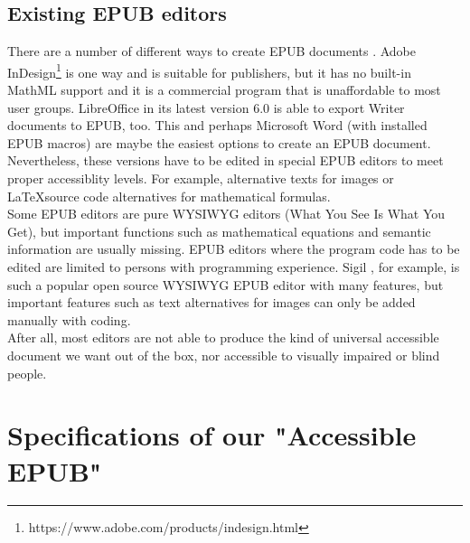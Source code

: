 \documentclass[runningheads,a4paper]{llncs}
\begin{document}
\subsection{Existing EPUB editors}
\label{ch:exEPUB}
There are a number of different ways to create EPUB documents \cite{EPUBprograms}. Adobe InDesign\footnote{https://www.adobe.com/products/indesign.html} is one way and is suitable for publishers, but it has no built-in MathML support and it is a commercial program that is unaffordable to most user groups. LibreOffice in its latest version 6.0 is able to export Writer documents to EPUB, too. This and perhaps Microsoft Word (with installed EPUB macros) are maybe the easiest options to create an EPUB document. Nevertheless, these versions have to be edited in special EPUB editors to meet proper accessiblity levels. For example, alternative texts for images or \LaTeX source code alternatives for mathematical formulas.\\
Some EPUB editors are pure WYSIWYG editors (What You See Is What You Get), but important functions such as mathematical equations and semantic information are usually missing. EPUB editors where the program code has to be edited are limited to persons with programming experience. Sigil \cite{Sigil}, for example, is such a popular open source WYSIWYG EPUB editor with many features, but important features such as text alternatives for images can only be added manually with coding.\\
After all, most editors are not able to produce the kind of universal accessible document we want out of the box, nor accessible to visually impaired or blind people. 

\section{Specifications of our "Accessible EPUB"}
\end{document}
